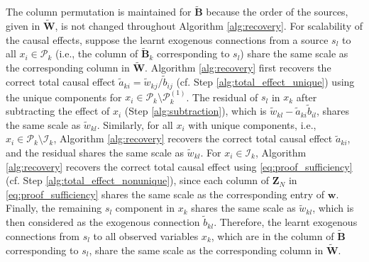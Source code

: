 \documentclass[12pt]{article}
\newcommand{\setP}{\mathcal{P}}
\newcommand{\setI}{\mathcal{I}}
\newcommand{\bB}{\mathbf{B}}
\newcommand{\bW}{\mathbf{W}}
\begin{document}
The column permutation is maintained for $\tilde{\bB}$ because the order of the sources, given in $\tilde{\bW}$, is not changed throughout Algorithm \ref{alg:recovery}. 
For scalability of the causal effects, 
suppose the learnt exogenous connections from a source $s_l$ to all $x_i\in\mathcal{P}_k$ (i.e., the column of $\tilde{\bB}_k$ corresponding to $s_l$) share the same scale as the corresponding column in $\tilde{\bW}$. Algorithm \ref{alg:recovery} first recovers the correct total causal effect $\tilde{a}_{ki}=\tilde{w}_{kj}/\tilde{b}_{ij}$ (cf. Step \ref{alg:total_effect_unique}) using the unique components for $x_i\in \mathcal{P}_{k} \setminus \mathcal{P}_{k}^{(1)}$. The residual of $s_l$ in $x_k$ after subtracting the effect of $x_i$ (Step \ref{alg:subtraction}), which is  $\tilde{w}_{kl}-\tilde{a}_{ki} \tilde{b}_{il}$, shares the same scale as $\tilde{w}_{kl}$. Similarly, for all $x_i$ with unique components, i.e., $x_i\in \setP_k\setminus \setI_k$, Algorithm \ref{alg:recovery} recovers the correct total causal effect $\tilde{a}_{ki}$, and the residual shares the same scale as $\tilde{w}_{kl}$. For $x_i\in \setI_k$, Algorithm \ref{alg:recovery} recovers the correct total causal effect using \eqref{eq:proof_sufficiency} (cf. Step \ref{alg:total_effect_nonunique}), since each column of $\mathbf{Z}_N$ in \eqref{eq:proof_sufficiency} shares the same scale as the corresponding entry of $\mathbf{w}$. Finally, the remaining $s_l$ component in $x_k$ shares the same scale as $\tilde{w}_{kl}$, which is then considered as the exogenous connection $\tilde{b}_{kl}$. Therefore, the learnt exogenous connections from $s_l$ to all observed variables $x_k$, which are in the column of $\tilde{\bB}$ corresponding to $s_l$, share the same scale as the corresponding column in $\tilde{\bW}$.
\end{document}
